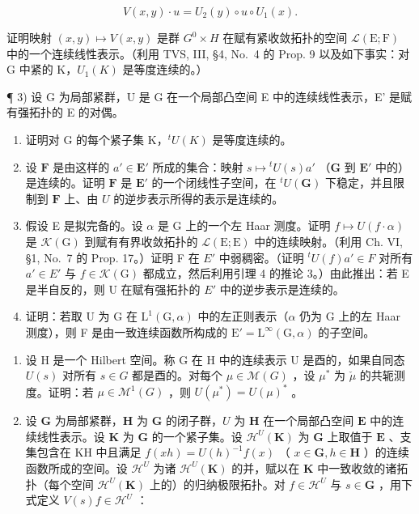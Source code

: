 \[
V (x, y) \cdot u = U _ {2} (y) \circ u \circ U _ {1} (x).
\]

证明映射 \((x,y)\mapsto V(x,y)\) 是群 \(G^{0}\times H\) 在赋有紧收敛拓扑的空间 \(\mathcal{L}(\mathrm{E};\mathrm{F})\) 中的一个连续线性表示。（利用 TVS, III, §4, No.~4 的 Prop. 9 以及如下事实：对 G 中紧的 K，\(U_{1}(K)\) 是等度连续的。）

¶ 3) 设 G 为局部紧群，U 是 G 在一个局部凸空间 E 中的连续线性表示，E' 是赋有强拓扑的 E 的对偶。

\begin{enumerate}
\def\labelenumi{\alph{enumi})}
\item
  证明对 G 的每个紧子集 K，\({}^{t}U(K)\) 是等度连续的。
\item
  设 \(\mathbf{F}\) 是由这样的 \(a' \in \mathbf{E}'\) 所成的集合：映射 \(s \mapsto {}^t U(s)a'\) （\(\mathbf{G}\) 到 \(\mathbf{E}'\) 中的）是连续的。证明 \(\mathbf{F}\) 是 \(\mathbf{E}'\) 的一个闭线性子空间，在 \({}^t U(\mathbf{G})\) 下稳定，并且限制到 \(\mathbf{F}\) 上、由 \(U\) 的逆步表示所得的表示是连续的。
\item
  假设 E 是拟完备的。设 \(\alpha\) 是 G 上的一个左 Haar 测度。证明 \(f \mapsto U(f \cdot \alpha)\) 是 \(\mathcal{K}(\mathrm{G})\) 到赋有有界收敛拓扑的 \(\mathcal{L}(\mathrm{E};\mathrm{E})\) 中的连续映射。（利用 Ch. VI, §1, No.~7 的 Prop. 17。）证明 F 在 \(E'\) 中弱稠密。（证明 \({}^{t}U(f)a' \in F\) 对所有 \(a' \in E'\) 与 \(f \in \mathcal{K}(\mathrm{G})\) 都成立，然后利用引理 4 的推论 3。）由此推出：若 E 是半自反的，则 U 在赋有强拓扑的 \(E'\) 中的逆步表示是连续的。
\item
  证明：若取 U 为 G 在 \(\mathrm{L}^{1}(\mathrm{G},\alpha)\) 中的左正则表示（\(\alpha\) 仍为 G 上的左 Haar 测度），则 F 是由一致连续函数所构成的 \(\mathrm{E}' = \mathrm{L}^{\infty}(\mathrm{G},\alpha)\) 的子空间。
\end{enumerate}

\begin{enumerate}
\def\labelenumi{\arabic{enumi})}
\setcounter{enumi}{3}
\item
  设 H 是一个 Hilbert 空间。称 G 在 H 中的连续表示 U 是酉的，如果自同态 \(U(s)\) 对所有 \(s \in G\) 都是酉的。对每个 \(\mu \in \mathcal{M}(G)\) ，设 \(\mu^{*}\) 为 \(\check{\mu}\) 的共轭测度。证明：若 \(\mu \in \mathcal{M}^{1}(G)\) ，则 \(U(\mu^{*}) = U(\mu)^{*}\) 。
\item
  设 \(\mathbf{G}\) 为局部紧群，\(\mathbf{H}\) 为 \(\mathbf{G}\) 的闭子群，\(U\) 为 \(\mathbf{H}\) 在一个局部凸空间 \(\mathbf{E}\) 中的连续线性表示。设 \(\mathbf{K}\) 为 \(\mathbf{G}\) 的一个紧子集。设 \(\mathcal{H}^U(\mathbf{K})\) 为 \(\mathbf{G}\) 上取值于 \(\mathbf{E}\) 、支集包含在 \(\mathrm{KH}\) 中且满足 \(f(xh) = U(h)^{-1}f(x)\) （ \(x \in \mathbf{G}, h \in \mathbf{H}\) ）的连续函数所成的空间。设 \(\mathcal{H}^U\) 为诸 \(\mathcal{H}^U(\mathbf{K})\) 的并，赋以在 \(\mathbf{K}\) 中一致收敛的诸拓扑（每个空间 \(\mathcal{H}^U(\mathbf{K})\) 上的）的归纳极限拓扑。对 \(f \in \mathcal{H}^U\) 与 \(s \in \mathbf{G}\) ，用下式定义 \(V(s)f \in \mathcal{H}^U\) ：
\end{enumerate}

